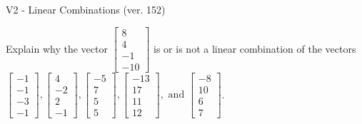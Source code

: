 \begin{exercise}
  \begin{exerciseTitle}V2 - Linear Combinations (ver. 152)\end{exerciseTitle}
  \begin{exerciseStatement}
    Explain why the vector \(\left[\begin{array}{c}
8 \\
4 \\
-1 \\
-10
\end{array}\right]\)  is or is not a linear 
	combination of the vectors \(\left[\begin{array}{c}
-1 \\
-1 \\
-3 \\
-1
\end{array}\right] , \left[\begin{array}{c}
4 \\
-2 \\
2 \\
-1
\end{array}\right] , \left[\begin{array}{c}
-5 \\
7 \\
5 \\
5
\end{array}\right] , \left[\begin{array}{c}
-13 \\
17 \\
11 \\
12
\end{array}\right] , \text{ and } \left[\begin{array}{c}
-8 \\
10 \\
6 \\
7
\end{array}\right]\).
	



\end{exerciseStatement}
\end{exercise}
